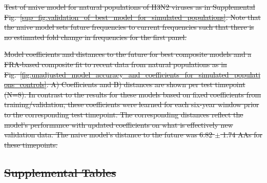 \documentclass[9pt,lineno]{elife} %
\providecommand{\DIFdel}[1]{{\protect\color{red}\sout{#1}}}                      %
\providecommand{\DIFdelFL}[1]{\DIFdel{#1}} %
\providecommand{\DIFdeltex}[1]{{\protect\color{red}\sout{#1}}}                      %
\providecommand{\DIFdelFL}[1]{\DIFdel{#1}} %
\providecommand{\DIFdel}[1]{\texorpdfstring{\DIFdeltex{#1}}{}} %
\begin{document}
{%
\DIFdelFL{Test of naive model for natural populations of H3N2 viruses as in Supplemental Fig.~\ref{sup_fig:validation_of_best_model_for_simulated_populations}.
  Note that the naive model sets future frequencies to current frequencies such that there is no estimated fold change in frequencies for the first panel.
  }}

{%
\DIFdelFL{Model coefficients and distances to the future for best composite models and a FRA-based composite fit to recent data from natural populations as in Fig.~\ref{fig:unadjusted_model_accuracy_and_coefficients_for_simulated_populations_controls}.
    A) Coefficients and B) distances are shown per test timepoint (N=8).
    In contrast to the results for these models based on fixed coefficients from training/validation, these coefficients were learned for each six-year window prior to the corresponding test timepoint.
    The corresponding distances reflect the model's performance with updated coefficients on what is effectively new validation data.
    The naive model's distance to the future was 6.82 $\pm$ 1.74 AAs for these timepoints.
  }}

\subsection*{\DIFdel{Supplemental Tables}}
\end{document}
